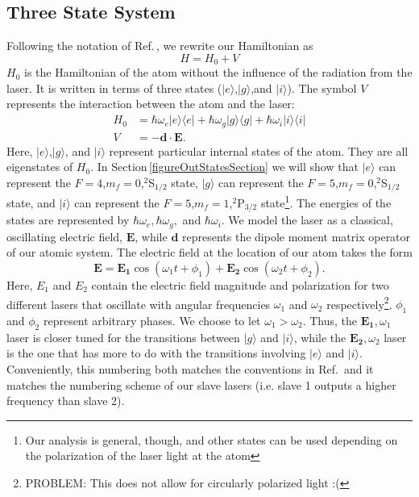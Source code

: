 \subsection{Three State System}
Following the notation of Ref.\,\cite{Young1997363}, we rewrite our Hamiltonian as
\begin{equation}
H=H_0+V
\end{equation}
$H_0$ is the Hamiltonian of the atom without the influence of the radiation from the laser. It is written in terms of three states ($|e\rangle$,$|g\rangle$,and $|i\rangle$). The symbol $V$ represents the interaction between the atom and the laser: 
\begin{align}
H_0&=
\hbar\omega_e |e\rangle\langle e | +
\hbar\omega_g |g\rangle\langle g | +
\hbar\omega_i |i\rangle\langle i | \\ 
V&=-\mathbf{d}\cdot\mathbf{E}.
\end{align}
Here, $|e\rangle$,$|g\rangle$, and $|i\rangle$ represent particular internal states of the atom. They are all eigenstates of $H_0$. In Section\,\ref{figureOutStatesSection} we will show that $|e\rangle$ can represent the $F=4$,$m_f=0$,$^2$S$_{1/2}$ state, $|g\rangle$ can represent the $F=5$,$m_f=0$,$^2$S$_{1/2}$ state, and $|i\rangle$ can represent the $F=5$,$m_f=1$,$^2$P$_{3/2}$ state\footnote{Our analysis is general, though, and other states can be used depending on the polarization of the laser light at the atom}. The energies of the states are represented by $\hbar\omega_e,\hbar\omega_g,$ and $\hbar\omega_i$. We model the laser as a classical, oscillating electric field, $\mathbf{E}$, while $\mathbf{d}$ represents the dipole moment matrix operator of our atomic system. The electric field at the location of our atom takes the form 
\begin{equation}
\mathbf{E}=\mathbf{E_1} \cos(\omega_1 t + \phi_1) + \mathbf{E_2} \cos(\omega_2t + \phi_2). \label{eqn:Efield}
\end{equation}
Here, $E_1$ and $E_2$ contain the electric field magnitude and polarization for two different lasers that oscillate with angular frequencies $\omega_1$ and $\omega_2$ respectively\footnote{PROBLEM: This does not allow for circularly polarized light :(}. $\phi_1$ and $\phi_2$ represent arbitrary phases. We choose to let $\omega_1>\omega_2$. Thus, the $\mathbf{E_1}, \omega_1$ laser is closer tuned for the transitions between $|g\rangle$ and $|i\rangle$, while the $\mathbf{E_2}, \omega_2$ laser is the one that has more to do with the transitions involving $|e\rangle$ and $|i\rangle$. Conveniently, this numbering both matches the conventions in Ref.\,\cite{Young1997363} and it matches the numbering scheme of our slave lasers (i.e. slave 1 outputs a higher frequency than slave 2). 

